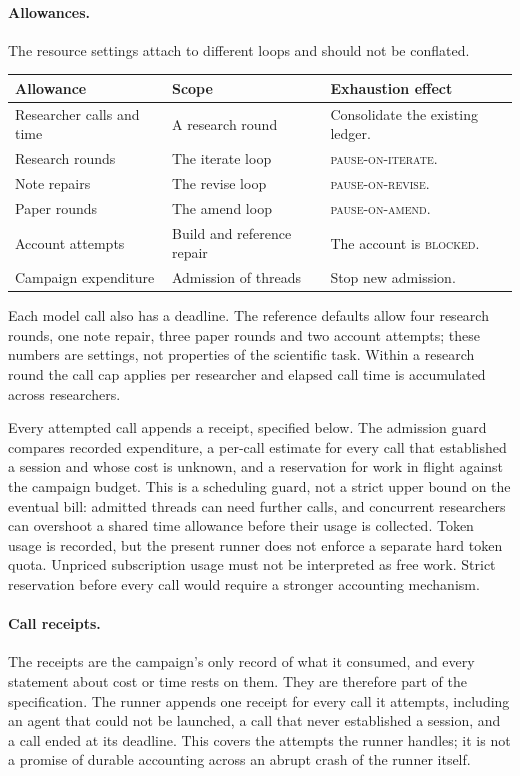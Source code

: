 \documentclass[11pt,a4paper]{article}
\newcommand{\st}[1]{\textsc{#1}}
\begin{document}
\paragraph{Allowances.}
The resource settings attach to different loops and should not be conflated.
\begin{center}
\begin{tabularx}{\textwidth}{@{}l>{\raggedright\arraybackslash}X>{\raggedright\arraybackslash}X@{}}
\toprule
Allowance & Scope & Exhaustion effect \\
\midrule
Researcher calls and time & A research round & Consolidate the existing ledger.
\\
Research rounds & The iterate loop & \st{pause-on-iterate}. \\
Note repairs & The revise loop & \st{pause-on-revise}. \\
Paper rounds & The amend loop & \st{pause-on-amend}. \\
Account attempts & Build and reference repair & The account is \st{blocked}. \\
Campaign expenditure & Admission of threads & Stop new admission. \\
\bottomrule
\end{tabularx}
\end{center}
Each model call also has a deadline. The reference defaults allow four research
rounds, one note repair, three paper rounds and two account attempts; these
numbers are settings, not properties of the scientific task. Within a research
round the call cap applies per researcher and elapsed call time is accumulated
across researchers.

Every attempted call appends a receipt, specified below. The admission guard
compares recorded expenditure, a per-call estimate for every call that
established a session and whose cost is unknown, and a reservation for work in
flight against the campaign budget. This is a
scheduling guard, not a strict upper bound on the eventual bill: admitted
threads can need further calls, and concurrent researchers can overshoot a
shared time allowance before their usage is collected. Token usage is recorded,
but the present runner does not enforce a separate hard token quota. Unpriced
subscription usage must not be interpreted as free work. Strict reservation
before every call would require a stronger accounting mechanism.

\paragraph{Call receipts.}
The receipts are the campaign's only record of what it consumed, and every
statement about cost or time rests on them. They are therefore part of the
specification. The runner appends one receipt for every call it attempts,
including an agent that could not be launched, a call that never established a
session, and a call ended at its deadline. This covers the attempts the runner
handles; it is not a promise of durable accounting across an abrupt crash of the
runner itself.
\end{document}
